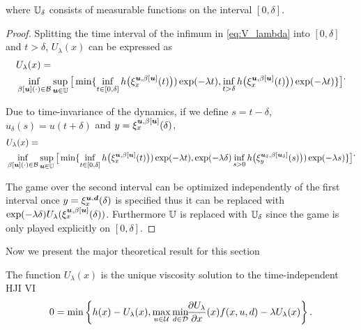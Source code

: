 \begin{for_journal}
\begin{lemma}
\noindent where $\mathbb{U}_{\delta}$ consists of measurable functions on the interval
$[0,\delta]$.
\end{lemma}

\begin{proof}
Splitting the time interval of the infimum in \eqref{eq:V_lambda} into $[0,\delta]$ and $t>\delta$, $U_{\lambda}(x)$ can be expressed as
\begin{equation}
\begin{split}{}{}{}
&U_{\lambda}(x) =\\ 
&\inf_{\beta[\bm{u}](\cdot) \in \mathcal{B}} \sup_{\bm{u} \in \mathbb{U}} 
\big [\min\{\inf_{t \in [0, \delta]} h\big(\xi_{x}^{\bm{u},\beta[\bm{u}]}(t)\big))\exp(-\lambda  t), \inf_{t > \delta} h\big(\xi_{x}^{\bm{u},\beta[\bm{u}]}(t)\big))\exp(-\lambda  t)\}
\big ]
\end{split}.
\end{equation}

Due to time-invariance of the dynamics, if we define $s=t-\delta$, $u_\delta(s)=u(t+\delta)$ and $y=\xi_{x}^{\bm{u},\beta[\bm{u}]}(\delta)$,
\begin{equation}
\begin{split}{}{}{}
&U_{\lambda}(x) =\\ 
&\inf_{\beta[\bm{u}](\cdot) \in \mathcal{B}} \sup_{\bm{u} \in \mathbb{U}} 
\big [\min\{\inf_{t \in [0, \delta]} h\big(\xi_{x}^{\bm{u},\beta[\bm{u}]}(t)\big))\exp(-\lambda  t),\exp(-\lambda \delta) \inf_{s > 0} h\big(\xi_{y}^{\bm{u}_\delta,\beta[\bm{u}_\delta]}(s)\big))\exp(-\lambda s)\}
\big ]
\end{split}.
\end{equation}

The game over the second interval can be optimized independently of the first interval once $y=\xi_{x}^{\bm{u},\bm{d}}(\delta)$ is specified thus it can be replaced with $\exp(-\lambda \delta)U_{\lambda}(\xi_{x}^{\bm{u},\beta[\bm{u}]}(\delta))$. Furthermore $\mathbb{U}$ is replaced with $\mathbb{U}_\delta$ since the game is only played explicitly on $[0,\delta]$.
\end{proof}

Now we present the major theoretical result for this section

\begin{proposition}
The function $U_{\lambda}(x)$ is the unique viscosity solution to the time-independent HJI VI
\begin{equation}\label{eq:HJI_lambda}
    0 = \min\left\{h(x)-U_{\lambda}(x), \max_{u\in\mathcal{U}} \min_{ d\in\mathcal{D}} \!\!\frac{\partial U_{\lambda}}{\partial x}(x) f(x,u, d) - \lambda U_{\lambda}(x)\right\}.
\end{equation}
\end{proposition}


\end{for_journal}
